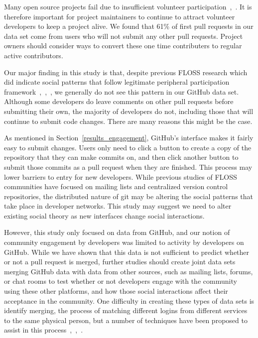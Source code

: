 \documentclass{iitthesis}
\begin{document}
Many open source projects fail due to insufficient volunteer
participation~\cite{crowston_defining_2003},~\cite{krishnamurthy_cave_2002}. It
is therefore important for project maintainers to continue to attract volunteer
developers to keep a project alive. We found that 61\% of first pull requests
in our data set come from users who will not submit any other pull requests.
Project owners should consider ways to convert these one time contributers to
regular active contributors.

 \label{sec:future_work}

Our major finding in this study is that, despite previous FLOSS research which
did indicate social patterns that follow legitimate peripheral participation
framework~\cite{ducheneaut_socialization_2005},~\cite{huang_mining_2005},~\cite{ye_toward_2003},
we generally do not see this pattern in our GitHub data set. Although some
developers do leave comments on other pull requests before submitting their own,
the majority of developers do not, including those that will continue to submit
code changes. There are many reasons this might be the case.

As mentioned in Section~\ref{results_engagement}, GitHub's interface makes it
fairly easy to submit changes. Users only need to click a button to create a
copy of the repository that they can make commits on, and then click another
button to submit those commits as a pull request when they are finished. This
process may lower barriers to entry for new developers. While previous studies
of FLOSS communities have focused on mailing lists and centralized version
control repositories, the distributed nature of git may be altering the social
patterns that take place in developer networks. This study may suggest we need
to alter existing social theory as new interfaces change social interactions.

However, this study only focused on data from GitHub, and our notion of
community engagement by developers was limited to activity by developers on
GitHub. While we have shown that this data is not sufficient to predict whether
or not a pull request is merged, further studies should create joint data sets
merging GitHub data with data from other sources, such as mailing lists, forums,
or chat rooms to test whether or not developers engage with the community using
these other platforms, and how those social interactions affect their acceptance
in the community. One difficulty in creating these types of data sets is
identify merging, the process of matching different logins from different
services to the same physical person, but a number of techniques have been
proposed to assist in this
process~\cite{bird_open_2007},~\cite{goeminne_comparison_2013},~\cite{kouters_whos_2012}.
\end{document}
